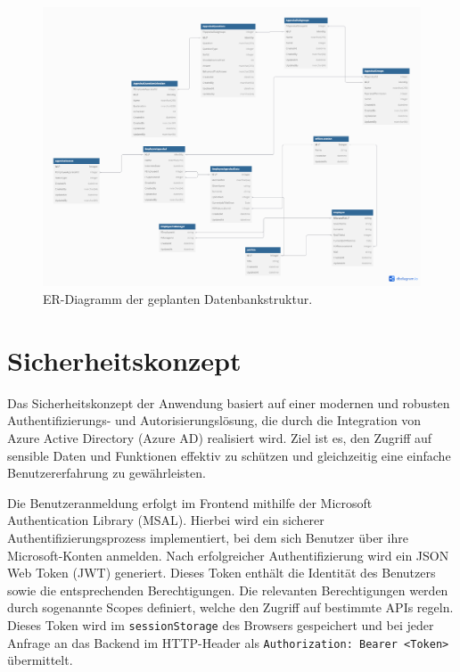 \begin{figure}
    \centering
    \includegraphics[width=1.1\textheight]{images/er_modell_design.png}
    \caption{ER-Diagramm der geplanten Datenbankstruktur.}
    \label{fig:db_er_model}
\end{figure}


\section{Sicherheitskonzept}

Das Sicherheitskonzept der Anwendung basiert auf einer modernen und robusten Authentifizierungs- und Autorisierungslösung, die durch die Integration von Azure Active Directory (Azure AD) realisiert wird. Ziel ist es, den Zugriff auf sensible Daten und Funktionen effektiv zu schützen und gleichzeitig eine einfache Benutzererfahrung zu gewährleisten.

Die Benutzeranmeldung erfolgt im Frontend mithilfe der Microsoft Authentication Library (MSAL). Hierbei wird ein sicherer Authentifizierungsprozess implementiert, bei dem sich Benutzer über ihre Microsoft-Konten anmelden. Nach erfolgreicher Authentifizierung wird ein JSON Web Token (JWT) generiert. Dieses Token enthält die Identität des Benutzers sowie die entsprechenden Berechtigungen. Die relevanten Berechtigungen werden durch sogenannte Scopes definiert, welche den Zugriff auf bestimmte APIs regeln. Dieses Token wird im \texttt{sessionStorage} des Browsers gespeichert und bei jeder Anfrage an das Backend im HTTP-Header als \texttt{Authorization: Bearer <Token>} übermittelt.

